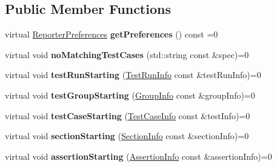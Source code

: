 \subsection*{Public Member Functions}
\begin{DoxyCompactItemize}
\item 
\hypertarget{struct_catch_1_1_i_streaming_reporter_a122d9136175aefb16ccc5d3b61f23711}{virtual \hyperlink{struct_catch_1_1_reporter_preferences}{Reporter\-Preferences} {\bfseries get\-Preferences} () const =0}\label{struct_catch_1_1_i_streaming_reporter_a122d9136175aefb16ccc5d3b61f23711}

\item 
\hypertarget{struct_catch_1_1_i_streaming_reporter_aaa0ea1d8250b48fafc8d36f86e6d1d80}{virtual void {\bfseries no\-Matching\-Test\-Cases} (std\-::string const \&spec)=0}\label{struct_catch_1_1_i_streaming_reporter_aaa0ea1d8250b48fafc8d36f86e6d1d80}

\item 
\hypertarget{struct_catch_1_1_i_streaming_reporter_a8c7b304d9563992a611dc7d68dc0c1ce}{virtual void {\bfseries test\-Run\-Starting} (\hyperlink{struct_catch_1_1_test_run_info}{Test\-Run\-Info} const \&test\-Run\-Info)=0}\label{struct_catch_1_1_i_streaming_reporter_a8c7b304d9563992a611dc7d68dc0c1ce}

\item 
\hypertarget{struct_catch_1_1_i_streaming_reporter_aef40d16994fe8a7ab140c885d8c2d7d0}{virtual void {\bfseries test\-Group\-Starting} (\hyperlink{struct_catch_1_1_group_info}{Group\-Info} const \&group\-Info)=0}\label{struct_catch_1_1_i_streaming_reporter_aef40d16994fe8a7ab140c885d8c2d7d0}

\item 
\hypertarget{struct_catch_1_1_i_streaming_reporter_a8f7270dc83853494a1c3a912ddf95a11}{virtual void {\bfseries test\-Case\-Starting} (\hyperlink{struct_catch_1_1_test_case_info}{Test\-Case\-Info} const \&test\-Info)=0}\label{struct_catch_1_1_i_streaming_reporter_a8f7270dc83853494a1c3a912ddf95a11}

\item 
\hypertarget{struct_catch_1_1_i_streaming_reporter_aa6236178937a43c2d7665729fcb79521}{virtual void {\bfseries section\-Starting} (\hyperlink{struct_catch_1_1_section_info}{Section\-Info} const \&section\-Info)=0}\label{struct_catch_1_1_i_streaming_reporter_aa6236178937a43c2d7665729fcb79521}

\item 
\hypertarget{struct_catch_1_1_i_streaming_reporter_ae1c3becff20f4a940c9f01d2c4114a17}{virtual void {\bfseries assertion\-Starting} (\hyperlink{struct_catch_1_1_assertion_info}{Assertion\-Info} const \&assertion\-Info)=0}\label{struct_catch_1_1_i_streaming_reporter_ae1c3becff20f4a940c9f01d2c4114a17}


\end{DoxyCompactItemize}
